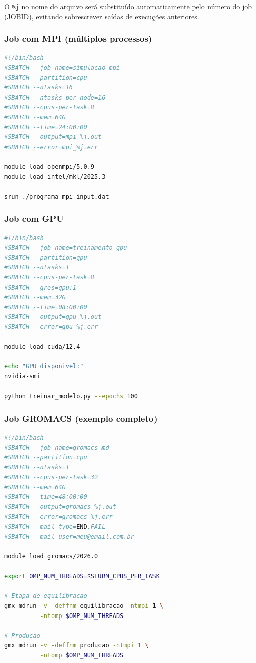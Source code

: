 \documentclass[11pt, a4paper]{article}
\begin{document}
O \texttt{\%j} no nome do arquivo será substituído automaticamente pelo número
do job (JOBID), evitando sobrescrever saídas de execuções anteriores.

\subsubsection{Job com MPI (múltiplos processos)}

\begin{lstlisting}[style=script, language=bash]
#!/bin/bash
#SBATCH --job-name=simulacao_mpi
#SBATCH --partition=cpu
#SBATCH --ntasks=16
#SBATCH --ntasks-per-node=16
#SBATCH --cpus-per-task=8
#SBATCH --mem=64G
#SBATCH --time=24:00:00
#SBATCH --output=mpi_%j.out
#SBATCH --error=mpi_%j.err

module load openmpi/5.0.9
module load intel/mkl/2025.3

srun ./programa_mpi input.dat
\end{lstlisting}

\subsubsection{Job com GPU}

\begin{lstlisting}[style=script, language=bash]
#!/bin/bash
#SBATCH --job-name=treinamento_gpu
#SBATCH --partition=gpu
#SBATCH --ntasks=1
#SBATCH --cpus-per-task=8
#SBATCH --gres=gpu:1
#SBATCH --mem=32G
#SBATCH --time=08:00:00
#SBATCH --output=gpu_%j.out
#SBATCH --error=gpu_%j.err

module load cuda/12.4

echo "GPU disponivel:"
nvidia-smi

python treinar_modelo.py --epochs 100
\end{lstlisting}

\subsubsection{Job GROMACS (exemplo completo)}

\begin{lstlisting}[style=script, language=bash]
#!/bin/bash
#SBATCH --job-name=gromacs_md
#SBATCH --partition=cpu
#SBATCH --ntasks=1
#SBATCH --cpus-per-task=32
#SBATCH --mem=64G
#SBATCH --time=48:00:00
#SBATCH --output=gromacs_%j.out
#SBATCH --error=gromacs_%j.err
#SBATCH --mail-type=END,FAIL
#SBATCH --mail-user=meu@email.com.br

module load gromacs/2026.0

export OMP_NUM_THREADS=$SLURM_CPUS_PER_TASK

# Etapa de equilibracao
gmx mdrun -v -deffnm equilibracao -ntmpi 1 \
          -ntomp $OMP_NUM_THREADS

# Producao
gmx mdrun -v -deffnm producao -ntmpi 1 \
          -ntomp $OMP_NUM_THREADS
\end{lstlisting}
\end{document}
